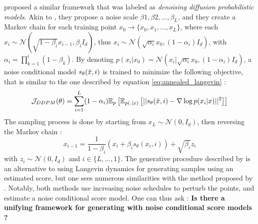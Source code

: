 \citep{sohldickstein2015deepunsupervisedlearningusing,ho2020denoisingdiffusionprobabilisticmodels} proposed a similar framework that was labeled as \textit{denoising diffusion probabilistic models}. Akin to \citep{song2020generativemodelingestimatinggradients}, they propose a noise scale $\beta{1},\beta{2},\ldots,\beta_{L}$, and they create a Markov chain for each training point $x_{0} \rightarrow \{x_{0},x_{1},\ldots,x_{L}\}$, where each $x_{i} \sim \mathcal{N}(\sqrt{1-\beta_{i}}x_{i-1},\beta_{i}I_{d})$, thus $x_{i} \sim \mathcal{N}(\sqrt{\alpha_{i}}x_{0},(1-\alpha_{i})I_{d})$, with $\alpha_{i} = \prod_{k=1}^{i}(1-\beta_{k})$. By denoting $p(x_{i}|x_{0}) = \mathcal{N}(x_{i}|\sqrt{\alpha_{i}}x_{0},(1-\alpha_{i})I_{d})$, a noise conditional model $s_{\theta}(\Tilde{x},i)$ is trained to minimize the following objective, that is similar to the one described by equation \ref{eq:annealed_langevin} : 
\begin{equation}\label{eq:ddpm}
    \mathcal{J}_{DDPM}(\theta) = \sum_{i=1}^{L} (1-\alpha_{i})\mathbb{E}_{p} \left[ \mathbb{E}_{p(.|x)}\left[ ||s_{\theta}(\Tilde{x},i) - \nabla \log p(x_{i}|x)||^{2} \right]  \right]
\end{equation}
The sampling process is done by starting from $x_{L} \sim \mathcal{N}(0,I_{d})$, then reversing the Markov chain :
\begin{equation}
    x_{i-1} = \frac{1}{1-\beta_i} \left( x_i + \beta_i s_\theta(x_i, i) \right) + \sqrt{\beta_i} z_i
\end{equation}
with $z_{i} \sim \mathcal{N}(0,I_{d})$ and $i \in \{L,\ldots,1\}$.
The generative procedure described by \citep{ho2020denoisingdiffusionprobabilisticmodels} is an alternative to using Langevin dynamics for generating samples using an estimated score, but one sees numerous similarities with the method proposed by \citep{song2020generativemodelingestimatinggradients}. Notably, both methods use increasing noise schedules to perturb the points, and estimate a noise conditional score model. One can thus ask : \textbf{Is there a unifying framework for generating with noise conditional score models ?}
